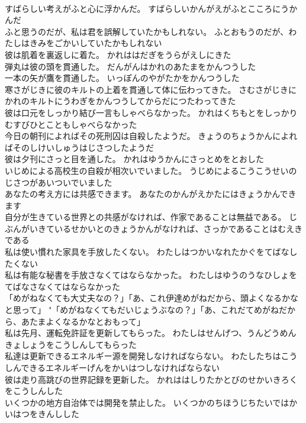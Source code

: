 \documentclass[8pt]{extreport}
\begin{document}
\begin{CJK}{UTF8}{min}
\\	すばらしい考えがふと心に浮かんだ。	すばらしいかんがえがふとこころにうかんだ 
\\	ふと思うのだが、私は君を誤解していたかもしれない。	ふとおもうのだが、わたしはきみをごかいしていたかもしれない 
\\	彼は肌着を裏返しに着た。	かれははだぎをうらがえしにきた 
\\	弾丸は彼の頭を貫通した。	だんがんはかれのあたまをかんつうした 
\\	一本の矢が鷹を貫通した。	いっぽんのやがたかをかんつうした 
\\	寒さがじきに彼のキルトの上着を貫通して体に伝わってきた。	さむさがじきにかれのキルトにうわぎをかんつうしてからだにつたわってきた 
\\	彼は口元をしっかり結び一言もしゃべらなかった。	かれはくちもとをしっかりむすびひとこともしゃべらなかった 
\\	今日の朝刊によればその死刑囚は自殺したようだ。	きょうのちょうかんによればそのしけいしゅうはじさつしたようだ 
\\	彼は夕刊にさっと目を通した。	かれはゆうかんにさっとめをとおした 
\\	いじめによる高校生の自殺が相次いでいました。	うじめによるこうこうせいのじさつがあいついでいました 
\\	あなたの考え方には共感できます。	あなたのかんがえかたにはきょうかんできます 
\\	自分が生きている世界との共感がなければ、作家であることは無益である。	じぶんがいきているせかいとのきょうかんがなければ、さっかであることはむえきである 
\\	私は使い慣れた家具を手放したくない。	わたしはつかいなれたかぐをてばなしたくない 
\\	私は有能な秘書を手放さなくてはならなかった。	わたしはゆうのうなひしょをてばなさなくてはならなかった 
\\	「めがねなくても大丈夫なの？」「あ、これ伊達めがねだから、頭よくなるかなと思って」	"「めがねなくてもだいじょうぶなの？」「あ、これだてめがねだから、あたまよくなるかなとおもって」 
\\	私は先月、運転免許証を更新してもらった。	わたしはせんげつ、うんどうめんきょしょうをこうしんしてもらった 
\\	私達は更新できるエネルギー源を開発しなければならない。	わたしたちはこうしんできるエネルギーげんをかいはつしなければならない 
\\	彼は走り高跳びの世界記録を更新した。	かれははしりたかとびのせかいきろくをこうしんした 
\\	いくつかの地方自治体では開発を禁止した。	いくつかのちほうじちたいではかいはつをきんしした 

\end{CJK}
\end{document}
